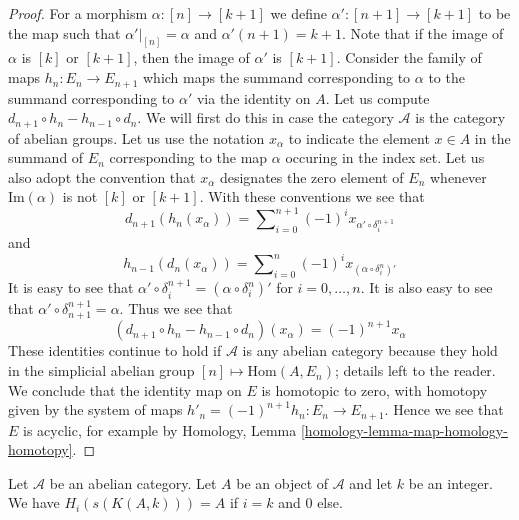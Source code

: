 \begin{proof}
For a morphism $\alpha : [n] \to [k + 1]$
we define $\alpha' : [n + 1] \to [k + 1]$ to be
the map such that $\alpha'|_{[n]} = \alpha$ and
$\alpha'(n + 1) = k + 1$. Note that if the
image of $\alpha$ is $[k]$ or $[k + 1]$, then
the image of $\alpha'$ is $[k + 1]$.
Consider the family of
maps $h_n : E_n \to E_{n + 1}$ which maps
the summand corresponding to $\alpha$ to
the summand corresponding to $\alpha'$ via
the identity on $A$.
Let us compute $d_{n + 1} \circ h_n - h_{n - 1} \circ d_n$.
We will first do this in case the category $\mathcal{A}$ is
the category of abelian groups.
Let us use the notation $x_\alpha$ to indicate
the element $x \in A$ in the summand of $E_n$ corresponding
to the map $\alpha$ occuring in the index set.
Let us also adopt the convention that
$x_\alpha$ designates the zero element of $E_n$
whenever $\text{Im}(\alpha)$ is not $[k]$ or $[k + 1]$.
With these conventions we see that
$$
d_{n + 1}(h_n(x_\alpha)) =
\sum\nolimits_{i = 0}^{n + 1} (-1)^i x_{\alpha' \circ \delta^{n + 1}_i}
$$
and
$$
h_{n - 1}(d_n(x_\alpha)) =
\sum\nolimits_{i = 0}^n (-1)^i x_{(\alpha \circ \delta_i^n)'}
$$
It is easy to see that
$\alpha' \circ \delta^{n + 1}_i = (\alpha \circ \delta_i^n)'$
for $i = 0, \ldots, n$. It is also easy to see that
$\alpha' \circ \delta^{n + 1}_{n + 1} = \alpha$. Thus we
see that
$$
(d_{n + 1} \circ h_n - h_{n - 1} \circ d_n)(x_\alpha)
=
(-1)^{n + 1} x_\alpha
$$
These identities continue to hold if $\mathcal{A}$ is any abelian
category because they hold in the simplicial abelian group
$[n] \mapsto \text{Hom}(A, E_n)$; details left to the reader.
We conclude that the identity map on $E$ is
homotopic to zero, with homotopy given by the
system of maps $h'_n = (-1)^{n + 1}h_n : E_n \to E_{n + 1}$.
Hence we see that $E$ is acyclic, for
example by Homology, Lemma \ref{homology-lemma-map-homology-homotopy}.
\end{proof}

\begin{lemma}
\label{lemma-homology-eilenberg-maclane}
Let $\mathcal{A}$ be an abelian category.
Let $A$ be an object of $\mathcal{A}$ and
let $k$ be an integer. We have
$H_i(s(K(A, k))) = A$ if $i = k$ and
$0$ else.
\end{lemma}

